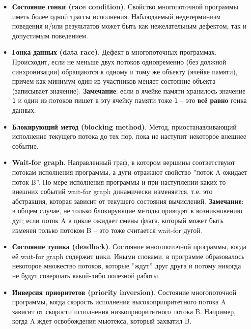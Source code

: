 \documentclass[a4paper, 12pt]{extarticle}
\begin{document}
\begin{itemize}
	\item \textbf{Состояние гонки (race condition)}. Свойство многопоточной программы иметь более одной трассы исполнения. Наблюдаемый недетерминизм поведения и/или результатов может быть как нежелательным дефектом, так и допустимым поведением.

	\item \textbf{Гонка данных (data race)}. Дефект в многопоточных программах. Происходит, если не меньше двух потоков одновременно (без должной синхронизации) обращаются к одному и тому же объекту (ячейке памяти), причем как минимум один из участников меняет состояние объекта (записывает значение). \textbf{Замечание}: если в ячейке памяти хранилось значение \texttt{1} и один из потоков пишет в эту ячейку памяти тоже \texttt{1} -- это \textbf{всё равно} гонка данных.
	
	\item \textbf{Блокирующий метод (blocking method)}. Метод, приостанавливающий исполнение текущего потока до тех пор, пока не наступит некоторое внешнее событие.

	\item \textbf{Wait-for graph}. Направленный граф, в котором вершины соответствуют потокам исполнения программы, а дуги отражают свойство ''поток A ожидает поток B''. По мере исполнения программы и при наступлении каких-то внешних событий wait-for graph динамически изменяется, т.е. это абстракция, которая зависит от текущего состояния вычислений. \textbf{Замечание}: в общем случае, не только блокирующие методы приводят к возникновению дуг; если поток A в цикле ожидает смены флага, который может быть изменен только потоком B -- это тоже считается wait-for дугой.

	\item \textbf{Состояние тупика (deadlock)}. Состояние многопоточной программы, когда её wait-for graph содержит цикл. Иными словами, в программе образовалось некоторое множество потоков, которые ''ждут'' друг друга и потому никогда не будут совершать какой-либо полезной работы.
	
	\item \textbf{Инверсия приоритетов (priority inversion)}. Состояние многопоточной программы, когда скорость исполнения высокоприоритетного потока A зависит от скорости исполнения низкоприоритетного потока B. Например, когда A ждет освобождения мьютекса, который захватил B.



\end{itemize}
\end{document}
